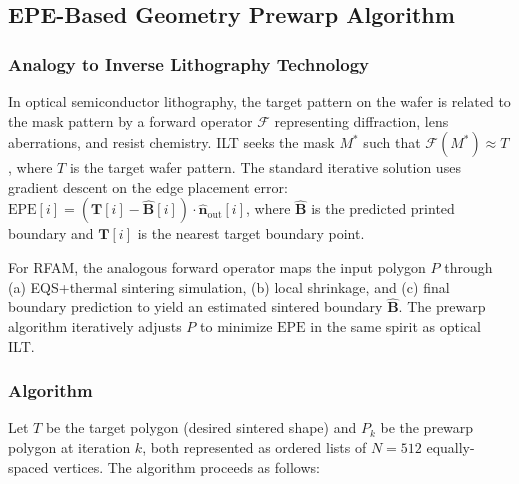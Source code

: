 \documentclass[10pt,twocolumn]{article}
\newcommand{\EPE}{\mathrm{EPE}}
\newcommand{\vect}[1]{\boldsymbol{#1}}
\newcommand{\nhat}{\hat{\vect{n}}}
\begin{document}
\subsection{EPE-Based Geometry Prewarp Algorithm}
\label{sec:prewarp_algorithm}

\subsubsection{Analogy to Inverse Lithography Technology}

In optical semiconductor lithography, the target pattern on the wafer
is related to the mask pattern by a forward operator $\mathcal{F}$
representing diffraction, lens aberrations, and resist chemistry.  ILT
seeks the mask $M^*$ such that $\mathcal{F}(M^*) \approx T$, where
$T$ is the target wafer pattern.  The standard iterative solution
uses gradient descent on the edge placement error:
$\EPE[i] = (\vect{T}[i] - \hat{\vect{B}}[i]) \cdot \nhat_{\mathrm{out}}[i]$,
where $\hat{\vect{B}}$ is the predicted printed boundary and
$\vect{T}[i]$ is the nearest target boundary point.

For RFAM, the analogous forward operator maps the input polygon $P$
through (a) EQS+thermal sintering simulation, (b) local shrinkage, and
(c) final boundary prediction to yield an estimated sintered boundary
$\hat{\vect{B}}$.  The prewarp algorithm iteratively adjusts $P$ to
minimize $\EPE$ in the same spirit as optical ILT.

\subsubsection{Algorithm}

Let $T$ be the target polygon (desired sintered shape) and $P_k$ be
the prewarp polygon at iteration $k$, both represented as ordered
lists of $N = 512$ equally-spaced vertices.  The algorithm proceeds
as follows:
\end{document}
